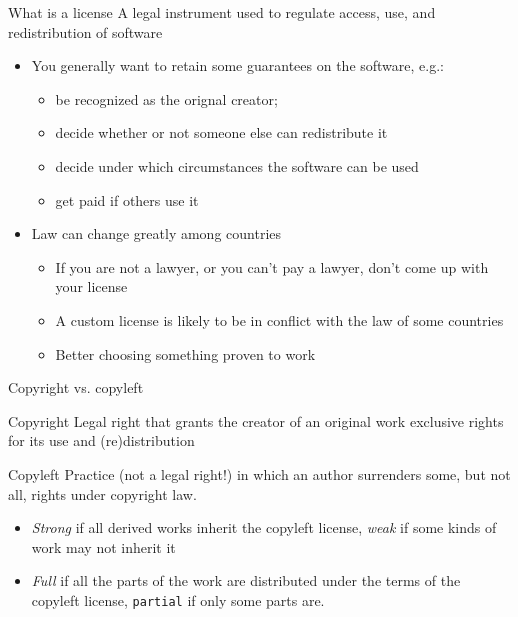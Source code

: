 \documentclass[presentation]{beamer}
\begin{document}
\begin{frame}{What is a license}
    A legal instrument used to regulate access, use, and redistribution of software
    \begin{itemize}
        \item You generally want to retain some guarantees on the software, e.g.:
        \begin{itemize}
            \item be recognized as the orignal creator;
            \item decide whether or not someone else can redistribute it
            \item decide under which circumstances the software can be used
            \item get paid if others use it
        \end{itemize}
        \item Law can change greatly among countries
        \begin{itemize}
            \item If you are not a lawyer, or you can't pay a lawyer, don't come up with your license
            \item A custom license is likely to be in conflict with the law of some countries
            \item Better choosing something proven to work
        \end{itemize}
    \end{itemize}
\end{frame}

\begin{frame}{Copyright vs. copyleft}
    \begin{block}{Copyright}
        Legal right that grants the creator of an original work exclusive rights for its use and (re)distribution
    \end{block}
    \begin{block}{Copyleft}
        Practice (not a legal right!) in which an author surrenders some, but not all, rights under copyright law.
        \begin{itemize}
            \item \textit{Strong} if all derived works inherit the copyleft license, \textit{weak} if some kinds of work may not inherit it
            \item \textit{Full} if all the parts of the work are distributed under the terms of the copyleft license, \texttt{partial} if only some parts are.
        \end{itemize}
    \end{block}
\end{frame}
\end{document}
